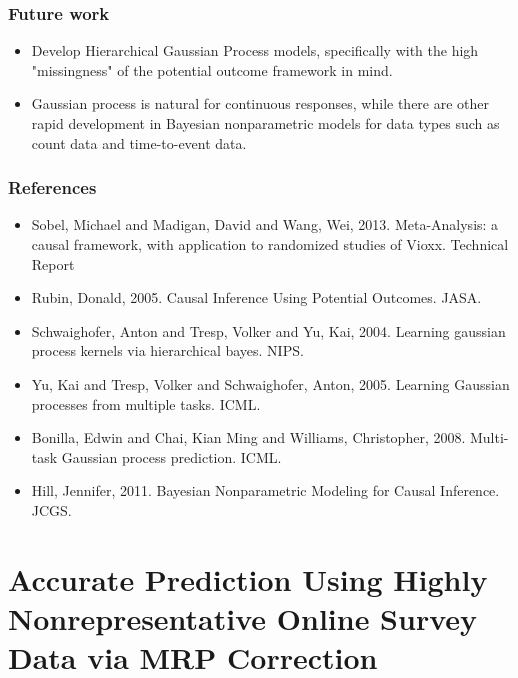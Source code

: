 \documentclass[xetex,mathserif,serif]{beamer}
\begin{document}
\begin{frame}
  \frametitle{Future work}
  \begin{itemize}
  \item Develop Hierarchical Gaussian Process models, specifically with the high
    "missingness" of the potential outcome framework in mind.
    \pause
    \vskip 12pt
  \item Gaussian process is natural for continuous responses, while there are
    other rapid development in Bayesian nonparametric models for data types such
    as count data and time-to-event data.
  \end{itemize}
\end{frame}

\begin{frame}
  \frametitle{References}
  \begin{itemize}
  \item Sobel, Michael and Madigan, David and Wang, Wei, 2013. Meta-Analysis: a
    causal framework, with application to randomized studies of Vioxx. Technical
    Report
  \item Rubin, Donald, 2005. Causal Inference Using Potential Outcomes. JASA.
  \item Schwaighofer, Anton and Tresp, Volker and Yu, Kai, 2004. Learning
    gaussian process kernels via hierarchical bayes. NIPS.
  \item Yu, Kai and Tresp, Volker and Schwaighofer, Anton, 2005. Learning Gaussian
    processes from multiple tasks. ICML.
  \item Bonilla, Edwin and Chai, Kian Ming and Williams, Christopher,
    2008. Multi-task Gaussian process prediction. ICML.
  \item Hill, Jennifer, 2011. Bayesian Nonparametric Modeling for Causal
    Inference. JCGS.
  \end{itemize}
  
\end{frame}
\section[Highly Nonrepresentative Polls]{Accurate Prediction Using Highly Nonrepresentative Online Survey Data via MRP
  Correction}
\end{document}
